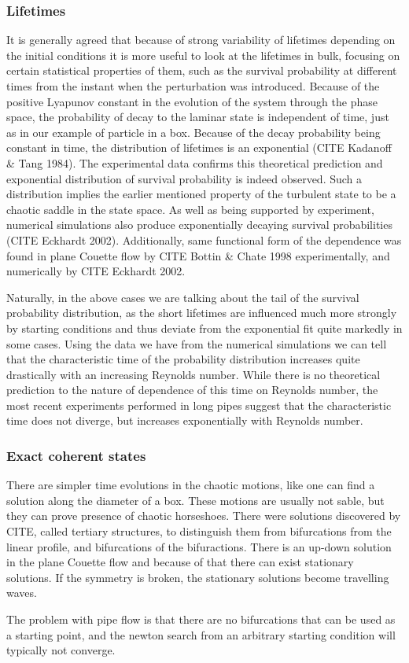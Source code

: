 \documentclass[11pt,a4paper]{article}
\begin{document}
\subsubsection{Lifetimes}
It is generally agreed that because of strong variability of lifetimes depending on the initial conditions it is more useful to look at the lifetimes in bulk, focusing on certain statistical properties of them, such as the survival probability at different times from the instant when the perturbation was introduced.
Because of the positive Lyapunov constant in the evolution of the system through the phase space, the probability of decay to the laminar state is independent of time, just as in our example of particle in a box.
Because of the decay probability being constant in time, the distribution of lifetimes is an exponential (CITE Kadanoff \& Tang 1984).
The experimental data confirms this theoretical prediction and exponential distribution of survival probability is indeed observed.
Such a distribution implies the earlier mentioned property of the turbulent state to be a chaotic saddle in the state space.
As well as being supported by experiment, numerical simulations also produce exponentially decaying survival probabilities (CITE Eckhardt 2002).
Additionally, same functional form of the dependence was found in plane Couette flow by CITE Bottin \& Chate 1998 experimentally, and numerically by CITE Eckhardt 2002.

Naturally, in the above cases we are talking about the tail of the survival probability distribution, as the short lifetimes are influenced much more strongly by starting conditions and thus deviate from the exponential fit quite markedly in some cases.
Using the data we have from the numerical simulations we can tell that the characteristic time of the probability distribution increases quite drastically with an increasing Reynolds number.
While there is no theoretical prediction to the nature of dependence of this time on Reynolds number, the most recent experiments performed in long pipes suggest that the characteristic time does not diverge, but increases exponentially with Reynolds number.

\subsubsection{Exact coherent states}
There are simpler time evolutions in the chaotic motions, like one can find a solution along the diameter of a box.
These motions are usually not sable, but they can prove presence of chaotic horseshoes.
There were solutions discovered by CITE, called tertiary structures, to distinguish them from bifurcations from the linear profile, and bifurcations of the bifuractions.
There is an up-down solution in the plane Couette flow and because of that there can exist stationary solutions.
If the symmetry is broken, the stationary solutions become travelling waves.

The problem with pipe flow is that there are no bifurcations that can be used as a starting point, and the newton search from an arbitrary starting condition will typically not converge.
\end{document}

